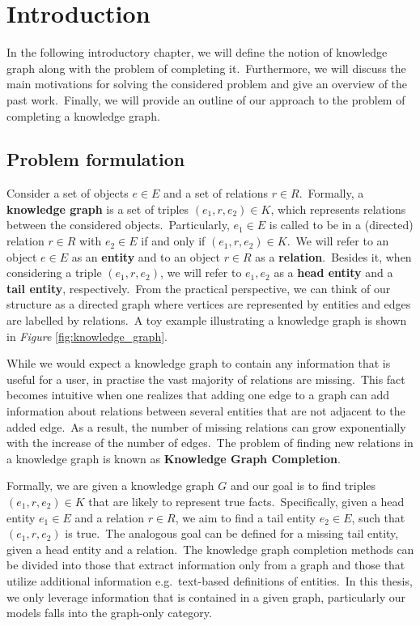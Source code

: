 \documentclass[longabstract, english, mgr]{iithesis}
\author         {Dawid Wegner}
\date           {29 września 2021}
\newcommand\numberedchapter[1]{\setlength\topskip{3cm}\chapter{#1}\setlength\topskip{0cm}}
\theoremstyle{default_theorem_style}\newtheorem{theorem}{Theorem}
\theoremstyle{default_theorem_style}\newtheorem{definition}{Definition}
\begin{document}
\numberedchapter{Introduction}

In the following introductory chapter, we will define the notion of knowledge graph along with the problem of
completing it.\ Furthermore, we will discuss the main motivations for solving the considered problem and give an
overview of the past work.\ Finally, we will provide an outline of our approach to the problem of completing a
knowledge graph.

\section{Problem formulation}

Consider a set of objects $e \in E$ and a set of relations $r \in R$.\ Formally, a \textbf{knowledge graph} is a set
of triples $(e_1, r, e_2) \in K$, which represents relations between the considered objects.\ Particularly,
$e_1 \in E$ is called to be in a (directed) relation $r \in R$ with $e_2 \in E$ if and only if
$(e_1, r, e_2) \in K$.\ We will refer to an object $e \in E$ as an \textbf{entity} and to an object
$r \in R$ as a \textbf{relation}.\ Besides it, when considering a triple $(e_1, r, e_2)$, we will refer to
$e_1, e_2$ as a \textbf{head entity} and a \textbf{tail entity}, respectively.\ From the practical perspective, we
can think of our structure as a directed graph where vertices are represented by entities and edges are labelled
by relations.\ A toy example illustrating a knowledge graph is shown in
\textit{Figure} \ref{fig:knowledge_graph}.\newline

\noindent While we would expect a knowledge graph to contain any information that is useful for a user, in practise
the vast majority of relations are missing.\ This fact becomes intuitive when one realizes that adding one edge
to a graph can add information about relations between several entities that are not adjacent to the added
edge.\ As a result, the number of missing relations can grow exponentially with the increase of the number of
edges.\ The problem of finding new relations in a knowledge graph is known
as \textbf{Knowledge Graph Completion}.\newline

\noindent Formally, we are given a knowledge graph $G$ and our goal is to find triples $(e_1, r, e_2) \in K$ that
are likely to represent true facts.\ Specifically, given a head entity $e_1 \in E$ and a relation $r \in R$, we
aim to find a tail entity $e_2 \in E$, such that $(e_1, r, e_2)$ is true.\ The analogous goal can be defined for
a missing tail entity, given a head entity and a relation.\ The knowledge graph completion methods can be divided
into those that extract information only from a graph and those that utilize additional information e.g.\ text-based
definitions of entities.\ In this thesis, we only leverage information that is contained in a given graph,
particularly our models falls into the graph-only category.
\end{document}
